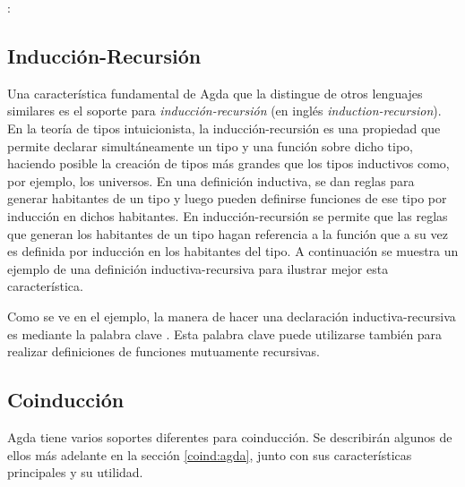  \AgdaSymbol{:} 

 \AgdaSymbol{:} \AgdaSymbol{(} : \AgdaSymbol{)} \AgdaSymbol{$\rightarrow$}  

\AgdaFunction{$\_\sqcup\_$} \AgdaSymbol{:} \AgdaSymbol{(} \AgdaSymbol{:} \AgdaSymbol{)} \AgdaSymbol{$\rightarrow$} 


\subsection{Inducción-Recursión}\label{additional:ind-rec}

Una característica fundamental de Agda que la distingue de otros lenguajes similares es el soporte para \textit{inducción-recursión} (en inglés \textit{induction-recursion}). En la teoría de tipos intuicionista, la inducción-recursión es una propiedad que permite declarar simultáneamente un tipo y una función sobre dicho tipo, haciendo posible la creación de tipos más grandes que los tipos inductivos como, por ejemplo, los universos. En una definición inductiva, se dan reglas para generar habitantes de un tipo y luego pueden definirse funciones de ese tipo por inducción en dichos habitantes. En inducción-recursión se permite que las reglas que generan los habitantes de un tipo hagan referencia a la función que a su vez es definida por inducción en los habitantes del tipo. A continuación se muestra un ejemplo de una definición inductiva-recursiva para ilustrar mejor esta característica. 


Como se ve en el ejemplo, la manera de hacer una declaración inductiva-recursiva es mediante la palabra clave . Esta palabra clave puede utilizarse también para realizar definiciones de funciones mutuamente recursivas. 


\subsection{Coinducción}\label{agda:coinduction}

Agda tiene varios soportes diferentes para coinducción. Se describirán algunos de ellos más adelante en la sección \ref{coind:agda}, junto con sus características principales y su utilidad.